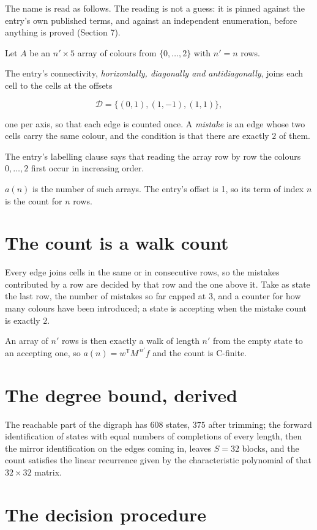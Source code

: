 \documentclass[11pt]{article}
\theoremstyle{definition}
\begin{document}
The name is read as follows. The reading is not a guess: it is pinned against the entry's own published terms, and against an independent enumeration, before anything is proved (Section 7).

Let $A$ be an $n' \times 5$ array of colours from $\{0,\dots,2\}$ with $n' = n$ rows.

The entry's connectivity, {\itshape horizontally, diagonally and antidiagonally}, joins each cell to the cells at the offsets

\[\mathcal{D} = \{(0,1), (1,-1), (1,1)\},\]

one per axis, so that each edge is counted once. A {\itshape mistake} is an edge whose two cells carry the same colour, and the condition is that there are exactly $2$ of them.

The entry's labelling clause says that reading the array row by row the colours $0,\dots,2$ first occur in increasing order.

$a(n)$ is the number of such arrays. The entry's offset is 1, so its term of index $n$ is the count for $n$ rows.

\section{The count is a walk count}

Every edge joins cells in the same or in consecutive rows, so the mistakes contributed by a row are decided by that row and the one above it. Take as state the last row, the number of mistakes so far capped at $3$, and a counter for how many colours have been introduced; a state is accepting when the mistake count is exactly $2$.

An array of $n'$ rows is then exactly a walk of length $n'$ from the empty state to an accepting one, so $a(n) = w^{\mathsf T}M^{\,n'}f$ and the count is C-finite.

\section{The degree bound, derived}

The reachable part of the digraph has $608$ states, $375$ after trimming; the forward identification of states with equal numbers of completions of every length, then the mirror identification on the edges coming in, leaves $S = 32$ blocks, and the count satisfies the linear recurrence given by the characteristic polynomial of that $32\times32$ matrix.

\section{The decision procedure}
\end{document}
